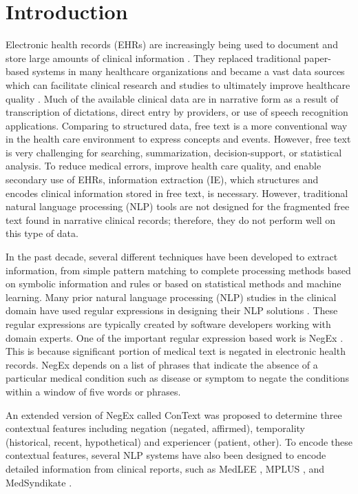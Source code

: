 \documentclass{amia}
\begin{document}
\section*{Introduction}
Electronic health records (EHRs) are increasingly being used to document and store large amounts of clinical information \cite{jha2009use}. They replaced traditional paper-based systems in many healthcare organizations and became a vast data sources which can facilitate clinical research and studies to ultimately improve healthcare quality \cite{blumenthal2010launching, erickstad2011use, lau2011use}. Much of the available clinical data are in narrative form as a result of transcription of dictations, direct entry by providers, or use of speech recognition applications. Comparing to structured data, free text is a more conventional way in the health care environment to express concepts and events. However, free text is very challenging for searching, summarization, decision-support, or statistical analysis. To reduce medical errors, improve health care quality, and enable secondary use of EHRs, information extraction (IE), which structures and encodes clinical information stored in free text, is necessary. However, traditional natural language processing (NLP) tools are not designed for the fragmented free text found in narrative clinical records; therefore, they do not perform well on this type of data. 

In the past decade, several different techniques have been developed to extract information, from simple pattern matching to complete processing methods based on symbolic information and rules or based on statistical methods and machine learning. Many prior natural language processing (NLP) studies in the clinical domain have used regular expressions in designing their NLP solutions \cite{stenner2012paste,piwowar2008identifying,denny2009identifying, mccart2012using,xu2011facilitating,matheny2009detection,zeng2006extracting,huang2007novel}. These regular expressions are typically created by software developers working with domain experts. One of the important regular expression based work is NegEx \cite{chapman2001simple}. This is because significant portion of medical text is negated in electronic health records. NegEx depends on a list of phrases that indicate the absence of a particular medical condition such as disease or symptom to negate the conditions within a window of five words or phrases. 

An extended version of NegEx called ConText \cite{harkema2009context} was proposed to determine three contextual features including negation (negated, affirmed), temporality (historical, recent, hypothetical) and experiencer (patient, other). To encode these contextual features, several NLP systems have also been designed to encode detailed information from clinical reports, such as MedLEE \cite{friedman2000broad}, MPLUS \cite{christensen2002mplus}, and MedSyndikate \cite{hahn2002medsyndikate}.
\end{document}
